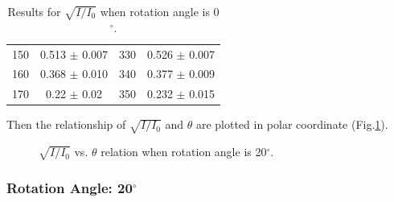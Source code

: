 \documentclass[a4paper]{article}
\begin{document}
\begin{table}[H]
\begin{tabular}{cc||cc}
		150                                & 0.513    $\pm$ 0.007 & 330                                & 0.526   $\pm$ 0.007 \\
		160                                & 0.368    $\pm$ 0.010 & 340                                & 0.377   $\pm$ 0.009 \\
		170                                & 0.22     $\pm$ 0.02  & 350                                & 0.232   $\pm$ 0.015 \\
		\hline
	\end{tabular}
	\caption{Results for $\sqrt{I/I_0}$ when rotation angle is 0$^\circ$.}
	\label{TableSqrt}
\end{table}

Then the relationship of $\sqrt{I/I_0}$ and $\theta$ are plotted in polar coordinate (Fig.\ref{fig::0degree}).

\begin{figure}[H]
	\centering
	\hspace{5mm}
	\hspace{5mm}
	\caption{$\sqrt{I/I_0}$ vs. $\theta$ relation when rotation angle is 20$^\circ$.}
	\label{fig::0degree}
\end{figure}

\subsubsection{Rotation Angle: 20$^\circ$}
\end{document}
